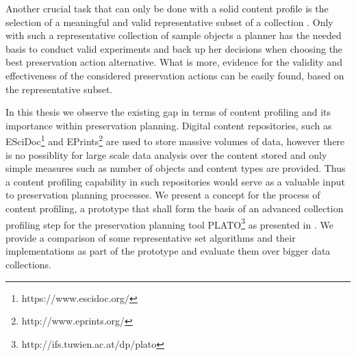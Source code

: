 Another crucial task that can only be done with a solid content profile is the selection of a meaningful and valid representative subset of a collection \cite{Becker:2011:PDT:1998076.1998089, Pan05findingrepresentative}. Only with such a representative collection of sample objects a planner 
has the needed basis to conduct valid experiments and back up her decisions when choosing the best
preservation action alternative. What is more, evidence for the validity and effectiveness of the considered preservation actions can be easily found, based on the representative subset.

In this thesis we observe the existing gap in terms of content profiling and its importance within preservation
planning. Digital content repositories, such as ESciDoc\footnote{https://www.escidoc.org/} and EPrints\footnote{http://www.eprints.org/} are used to store massive volumes of data, however there is no possiblity for large scale data analysis over the content stored and only simple measures such as number of objects and content types are provided. Thus a content profiling capability in such repositories would serve as a valuable input to preservation planning processes. We present a concept for the process of content profiling, a prototype that shall form the basis of an advanced collection profiling step for the preservation planning tool PLATO\footnote{http://ifs.tuwien.ac.at/dp/plato} as presented in \cite{Rauber:2009:dpchallenges}. We provide a comparison of some representative
set algorithms and their implementations as part of the prototype and evaluate them over bigger data collections.